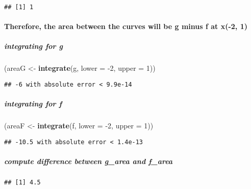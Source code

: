 \documentclass[]{article}
\newenvironment{Shaded}{\begin{snugshade}}{\end{snugshade}}
\newcommand{\DataTypeTok}[1]{\textcolor[rgb]{0.13,0.29,0.53}{#1}}
\newcommand{\DecValTok}[1]{\textcolor[rgb]{0.00,0.00,0.81}{#1}}
\newcommand{\KeywordTok}[1]{\textcolor[rgb]{0.13,0.29,0.53}{\textbf{#1}}}
\newcommand{\NormalTok}[1]{#1}
\newcommand{\OperatorTok}[1]{\textcolor[rgb]{0.81,0.36,0.00}{\textbf{#1}}}
\newcommand{\StringTok}[1]{\textcolor[rgb]{0.31,0.60,0.02}{#1}}
\let\oldparagraph\paragraph
\renewcommand{\paragraph}[1]{\oldparagraph{#1}\mbox{}}
\let\oldsubparagraph\subparagraph
\renewcommand{\subparagraph}[1]{\oldsubparagraph{#1}\mbox{}}
\begin{document}
\begin{verbatim}
## [1] 1
\end{verbatim}

\hypertarget{therefore-the-area-between-the-curves-will-be-g-minus-f-at-x-2-1}{%
\paragraph{Therefore, the area between the curves will be g minus f at
x(-2,
1)}\label{therefore-the-area-between-the-curves-will-be-g-minus-f-at-x-2-1}}

\hypertarget{integrating-for-g}{%
\subparagraph{integrating for g}\label{integrating-for-g}}

\begin{Shaded}
\begin{Highlighting}[]
\NormalTok{(areaG <-}\StringTok{ }\KeywordTok{integrate}\NormalTok{(g, }\DataTypeTok{lower =} \DecValTok{-2}\NormalTok{, }\DataTypeTok{upper =} \DecValTok{1}\NormalTok{))}
\end{Highlighting}
\end{Shaded}

\begin{verbatim}
## -6 with absolute error < 9.9e-14
\end{verbatim}

\hypertarget{integrating-for-f}{%
\subparagraph{integrating for f}\label{integrating-for-f}}

\begin{Shaded}
\begin{Highlighting}[]
\NormalTok{(areaF <-}\StringTok{ }\KeywordTok{integrate}\NormalTok{(f, }\DataTypeTok{lower =} \DecValTok{-2}\NormalTok{, }\DataTypeTok{upper =} \DecValTok{1}\NormalTok{))}
\end{Highlighting}
\end{Shaded}

\begin{verbatim}
## -10.5 with absolute error < 1.4e-13
\end{verbatim}

\hypertarget{compute-difference-between-g_area-and-f_area}{%
\subparagraph{compute difference between g\_area and
f\_area}\label{compute-difference-between-g_area-and-f_area}}

\begin{Shaded}
\end{Shaded}

\begin{verbatim}
## [1] 4.5
\end{verbatim}
\end{document}
